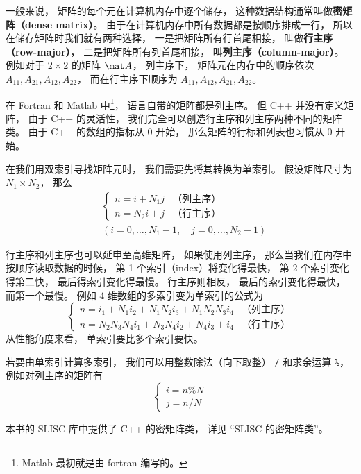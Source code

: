 

一般来说， 矩阵的每个元在计算机内存中逐个储存， 这种数据结构通常叫做\textbf{密矩阵（dense matrix）}。 由于在计算机内存中所有数据都是按顺序排成一行， 所以在储存矩阵时我们就有两种选择， 一是把矩阵所有行首尾相接， 叫做\textbf{行主序（row-major）}， 二是把矩阵所有列首尾相接， 叫\textbf{列主序（column-major）}。 例如对于 $2 \times 2$ 的矩阵 $\mat A$， 列主序下， 矩阵元在内存中的顺序依次 $A_{11}, A_{21}, A_{12}, A_{22}$， 而在行主序下顺序为 $A_{11},A_{12},A_{21},A_{22}$。

在 Fortran 和 Matlab 中\footnote{Matlab 最初就是由 fortran 编写的。}， 语言自带的矩阵都是列主序。 但 C++ 并没有定义矩阵， 由于 C++ 的灵活性， 我们完全可以创造行主序和列主序两种不同的矩阵类。 由于 C++ 的数组的指标从 0 开始， 那么矩阵的行标和列表也习惯从 0 开始。

在我们用双索引寻找矩阵元时， 我们需要先将其转换为单索引。 假设矩阵尺寸为 $N_1 \times N_2$， 那么
\begin{equation}
\begin{aligned}
&\begin{cases}
n = i + N_1 j  &\text{（列主序）}\\
n = N_2 i + j  &\text{（行主序）}
\end{cases}\\
&(i = 0, \dots, N_1-1,\quad j = 0, \dots, N_2-1)
\end{aligned}
\end{equation}

行主序和列主序也可以延申至高维矩阵， 如果使用列主序， 那么当我们在内存中按顺序读取数据的时候， 第 1 个索引（index）将变化得最快， 第 2 个索引变化得第二快， 最后得索引变化得最慢。 行主序则相反， 最后的索引变化得最快， 而第一个最慢。 例如 4 维数组的多索引变为单索引的公式为
\begin{equation}
\begin{cases}
n = i_1 + N_1 i_2 + N_1 N_2 i_3 + N_1 N_2 N_3 i_4  &\text{（列主序）}\\
n = N_2 N_3 N_4 i_1 + N_3 N_4 i_2 + N_4 i_3 + i_4  &\text{（行主序）}
\end{cases}
\end{equation}
从性能角度来看， 单索引要比多个索引要快。

若要由单索引计算多索引， 我们可以用整数除法（向下取整） \verb|/| 和求余运算 \verb|%|， 例如对列主序的矩阵有
\begin{equation}
\begin{cases}
i = n \% N\\
j = n / N
\end{cases}
\end{equation}

本书的 SLISC 库中提供了 C++ 的密矩阵类， 详见 “SLISC 的密矩阵类”。
